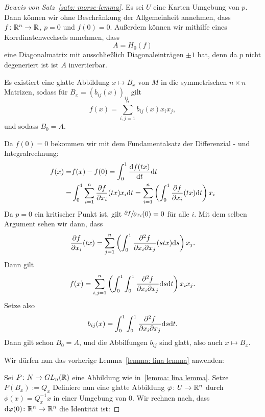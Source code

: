 \begin{proof}[Beweis von Satz~\ref{satz: morse-lemma}]
    Es sei $U$ eine Karten Umgebung von $p$. Dann können wir ohne Beschränkung der 
    Allgemeinheit annehmen, dass $f \colon { \mathbb R }^n \to { \mathbb R }$, $p = 0$ und $f(0) = 0$.
    Außerdem können wir mithilfe eines Korrdinatenwechsels annehmen, dass 
    \[ A = H_0(f) \]
    eine Diagonalmatrix mit ausschließlich Diagonaleinträgen $\pm 1$ hat, denn da $p$
    nicht degeneriert ist ist $A$ invertierbar. 
    \begin{claim*}
        Es existiert eine glatte Abbildung $x \mapsto B_x$ von $M$ in die symmetrischen
        $n \times n$ Matrizen, sodass für $B_x = (b_{ij}(x))_{ij}$ gilt 
        \[ f(x) = \sum_{i, j = 1}^n b_{ij}(x) x_i x_j , \]
        und sodass $B_0 = A$. 
    \end{claim*}
    \begin{smallproof}
        Da $f(0) = 0$ bekommen wir mit dem Fundamentalsatz der 
        Differenzial - und Integralrechnung: 
        \begin{align*}
            f(x) = & f(x) - f(0) 
                = \int_0^1 \derive[f (tx)]{t} \opd t \\
            = & \int_0^1 \sum_{i = 1}^n \pderive[f]{x_i}(tx) x_i \opd t 
                = \sum_{i = 1}^n \left( \int_0^1 \pderive[f]{x_i}(tx) \opd t \right) x_i
        \end{align*}
        Da $p = 0$ ein kritischer Punkt ist, gilt $\pderive[f]{x_i}(0) = 0$ für alle 
        $i$. Mit dem selben Argument sehen wir dann, dass
        \[ \pderive[f]{x_i}(tx) = 
        \sum_{j = 1}^n \left( \int_0^1 \pdderive[f]{x_i}{x_j}(stx) \opd s \right) x_j . \]
        Dann gilt 
        \[ f(x) = 
            \sum_{i, j = 1}^n 
            \left( \int_0^1 \int_0^1 \pdderive[f]{x_i}{x_j} \opd s \opd t \right) 
            x_i x_j 
        . \]
        Setze also 
        \[ b_{ij}(x) = \int_0^1 \int_0^1 \pdderive[f]{x_i}{x_j} \opd s \opd t . \]
        Dann gilt schon $B_0  = A$, und die Abbilfungen $b_{ij}$ sind glatt, also 
        auch $x \mapsto B_ x$.
    \end{smallproof}
    Wir dürfen nun das vorherige Lemma~\ref{lemma: lina lemma} anwenden:

    Sei $P \colon N \to GL_n({ \mathbb R })$ eine Abbildung wie in~\ref{lemma: lina lemma}.
    Setze $P(B_x) := Q_x$ Definiere nun eine glatte Abbildung $\varphi \colon U \to { \mathbb R }^n$
    durch $\phi (x) = Q_x^{-1}x$ in einer Umgebung von $0$. Wir rechnen nach, dass 
    ${ \operatorname{d} } \varphi (0) \colon { \mathbb R }^n \to { \mathbb R }^n$ die Identität ist:


\end{proof}
